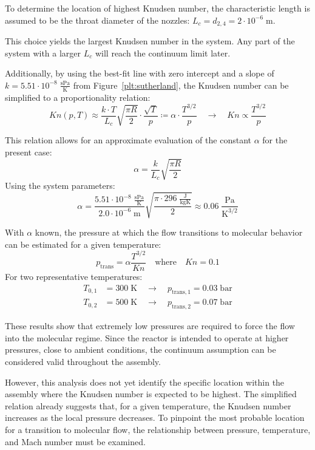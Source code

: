 	To determine the location of highest Knudsen number, the characteristic length is assumed to be the throat diameter of the nozzles: $L_c = d_{2,4} = 2 \cdot 10^{-6}\;\text{m}$.
	
	This choice yields the largest Knudsen number in the system.
	Any part of the system with a larger $L_c$ will reach the continuum limit later.

	Additionally, by using the best-fit line with zero intercept and a slope of $k = 5.51 \cdot10^{-8}\; \frac{\text{sPa}}{\text{K}}$ from Figure~\ref{plt:sutherland}, the Knudsen number can be simplified to a proportionality relation:
	\begin{equation}
		Kn(p,T) \approx
		\frac{ k \cdot T }{ L_c } \sqrt{ \frac{ \pi R }{ 2 } } \cdot \frac{ \sqrt{ T } }{ p }
		\coloneqq \alpha \cdot \frac{ T^{ 3/2 } }{ p }
		\quad \rightarrow \quad
		Kn \propto \frac{ T^{ 3/2 } }{ p }
	\end{equation}

	This relation allows for an approximate evaluation of the constant $\alpha$ for the present case:
	$$
		\alpha = \frac{k}{L_c}\sqrt{\frac{\pi R}{2}}
	$$
	Using the system parameters:
	$$
		\alpha = \frac{5.51 \cdot 10^{-8}\; \frac{\text{sPa}}{\text{K}}}{2.0 \cdot 10^{-6}\;\text{m}} \sqrt{\frac{\pi \cdot 296\; \frac{\text{J}}{\text{kgK}}}{2}}
		\approx 0.06\; \frac{\text{Pa}}{\text{K}^{3/2}}
	$$

	With $\alpha$ known, the pressure at which the flow transitions to molecular behavior can be estimated for a given temperature:
	$$
		p_\text{trans} = \alpha \frac{T^{3/2}}{Kn} \quad \text{where} \quad Kn = 0.1
	$$
	For two representative temperatures:
	\begin{align*}
		T_{0,1} &= 300\;\text{K} \quad \to \quad p_{\text{trans},1} = 0.03\;\text{bar}\\
		T_{0,2} &= 500\;\text{K} \quad \to \quad p_{\text{trans},2} = 0.07\;\text{bar}
	\end{align*}

	These results show that extremely low pressures are required to force the flow into the molecular regime.
	Since the reactor is intended to operate at higher pressures, close to ambient conditions, the continuum assumption can be considered valid throughout the assembly.

	However, this analysis does not yet identify the specific location within the assembly where the Knudsen number is expected to be highest.
	The simplified relation already suggests that, for a given temperature, the Knudsen number increases as the local pressure decreases.
	To pinpoint the most probable location for a transition to molecular flow, the relationship between pressure, temperature, and Mach number must be examined.

